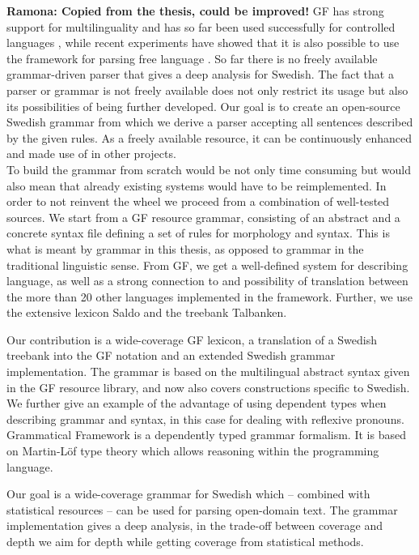 \documentclass[runningheads,a4paper]{llncs}
\begin{document}
\textbf{Ramona: Copied from the thesis, could be improved!}
GF has strong support for multilinguality and has so far been used successfully for 
controlled languages \cite{cnl}, while recent experiments have showed
that it is also possible to use the framework for parsing free language \cite{patent}.
So far there is no freely available grammar-driven parser that gives a deep
analysis for Swedish. The fact that a parser or grammar is not freely available
does not only restrict its usage but also its possibilities of being further
developed. Our goal is
to create an open-source Swedish grammar from which we derive a parser
accepting all sentences described by the given rules.
As a freely available resource, it can be continuously enhanced and
made use of in other projects.\\
\noindent To build the grammar from scratch would be not only time consuming but
would also mean that already existing systems would have to be reimplemented.
In order to not reinvent the wheel we proceed from a combination of well-tested
sources.
We start from a GF resource grammar, consisting of an abstract and a concrete syntax
file defining a set of rules for morphology and syntax.
This is what is meant by grammar in this thesis, as
opposed to grammar in the traditional linguistic sense. 
From GF, we get a well-defined system for describing language, as well as a
strong connection to and possibility of translation between the 
more than 20 other languages implemented in the framework. Further, we use
the extensive lexicon Saldo and the treebank Talbanken.

Our contribution is a wide-coverage GF lexicon, a translation of a Swedish treebank
into the GF notation and an extended Swedish grammar implementation. The grammar is based
on the multilingual abstract syntax given in the GF resource library, and now
also covers constructions specific to Swedish.
We further give an example of the advantage of using dependent types when
describing grammar and syntax, in this case for dealing with reflexive pronouns.
Grammatical Framework \cite{gfbok} is a dependently typed grammar formalism.
It is based on Martin-Löf type theory which allows
reasoning within the programming language.

Our goal is a wide-coverage grammar for Swedish which -- combined with statistical 
resources -- can be used for parsing open-domain text. The grammar implementation gives
a deep analysis, in the trade-off between coverage and depth we aim for depth
while getting coverage from statistical methods.\\
\end{document}
